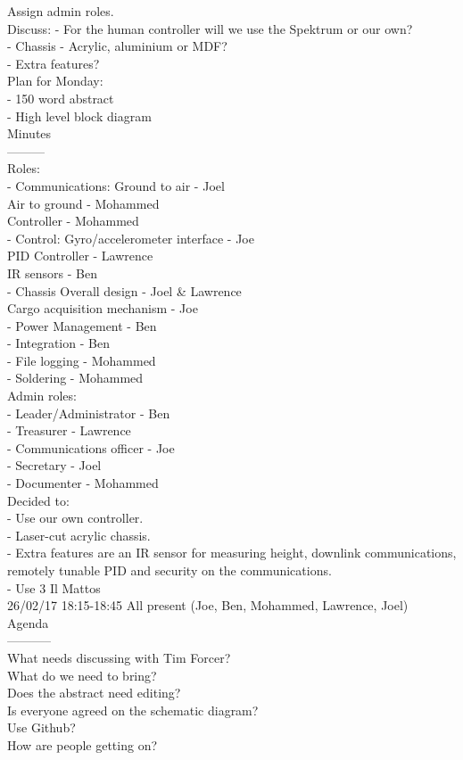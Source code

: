 \documentclass[a4paper,11pt]{article}
\begin{document}
Assign admin roles.\\

Discuss:
	- For the human controller will we use the Spektrum or our own?\\
	- Chassis - Acrylic, aluminium or MDF?\\
	- Extra features?\\
Plan for Monday:\\
	- 150 word abstract\\
	- High level block diagram\\

Minutes\\
---------\\
Roles:\\
	- Communications:	Ground to air - Joel\\
				Air to ground - Mohammed\\
				Controller - Mohammed\\
	- Control:		Gyro/accelerometer interface - Joe\\
				PID Controller - Lawrence\\
				IR sensors - Ben\\
	- Chassis		Overall design - Joel \& Lawrence\\
				Cargo acquisition mechanism - Joe\\
	- Power Management - Ben\\
	- Integration - Ben\\
	- File logging - Mohammed\\
	- Soldering - Mohammed\\

Admin roles:\\
	- Leader/Administrator - Ben\\
	- Treasurer - Lawrence\\
	- Communications officer - Joe\\
	- Secretary - Joel\\
	- Documenter - Mohammed\\

Decided to:\\
	- Use our own controller.\\
	- Laser-cut acrylic chassis.\\
	- Extra features are an IR sensor for measuring height, downlink communications, remotely tunable PID and security on the communications.\\
	- Use 3 Il Mattos\\

26/02/17 18:15-18:45 All present (Joe, Ben, Mohammed, Lawrence, Joel)\\
Agenda\\
-----------\\
What needs discussing with Tim Forcer?\\
What do we need to bring?\\
Does the abstract need editing?\\
Is everyone agreed on the schematic diagram?\\
Use Github?\\
How are people getting on?\\
\end{document}

